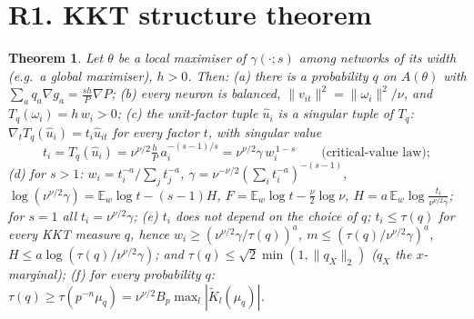 \documentclass[11pt]{article}
\newtheorem{theorem}{Theorem}\newtheorem{lemma}[theorem]{Lemma}\newtheorem{proposition}[theorem]{Proposition}
\theoremstyle{remark}\newtheorem{remark}[theorem]{Remark}
\newcommand{\E}{\mathbb E}\newcommand{\R}{\mathbb R}\newcommand{\Re}{\operatorname{Re}}
\begin{document}
\section{R1. KKT structure theorem}
\begin{theorem}\label{t:kkt}
Let $\theta$ be a local maximiser of $\gamma(\cdot;s)$ among networks of its width (e.g.\ a global maximiser), $h>0$. Then:
(a) there is a probability $q$ on $A(\theta)$ with $\sum_aq_a\nabla g_a=\frac{sh}P\nabla P$;
(b) every neuron is balanced, $\|v_{it}\|^2=\|\omega_i\|^2/\nu$, and $T_q(\omega_i)=h\,w_i>0$;
(c) the unit-factor tuple $\hat u_i$ is a singular tuple of $T_q$: $\nabla_tT_q(\hat u_i)=t_i\hat u_{it}$ for every factor $t$, with singular value
\[t_i=T_q(\hat u_i)=\nu^{\nu/2}\tfrac hP\,a_i^{-(s-1)/s}=\nu^{\nu/2}\gamma\,w_i^{\,1-s}\qquad\text{(critical-value law)};\]
(d) for $s>1$: $w_i=t_i^{-a}/\sum_jt_j^{-a}$, $\gamma=\nu^{-\nu/2}(\sum_it_i^{-a})^{-(s-1)}$,
$\log(\nu^{\nu/2}\gamma)=\E_w\log t-(s-1)H$, $F=\E_w\log t-\frac\nu2\log\nu$, $H=a\,\E_w\log\frac{t_i}{\nu^{\nu/2}\gamma}$; for $s=1$ all $t_i=\nu^{\nu/2}\gamma$;
(e) $t_i$ does not depend on the choice of $q$; $t_i\le\tau(q)$ for every KKT measure $q$, hence $w_i\ge(\nu^{\nu/2}\gamma/\tau(q))^a$,
$m\le(\tau(q)/\nu^{\nu/2}\gamma)^a$, $H\le a\log(\tau(q)/\nu^{\nu/2}\gamma)$; and $\tau(q)\le\sqrt2\min(1,\|q_X\|_2)$ ($q_X$ the $x$-marginal);
(f) for every probability $q$: $\tau(q)\ge\tau(p^{-n}\mu_q)=\nu^{\nu/2}B_p\max_l|\tilde K_l(\mu_q)|$.
\end{theorem}
\end{document}
